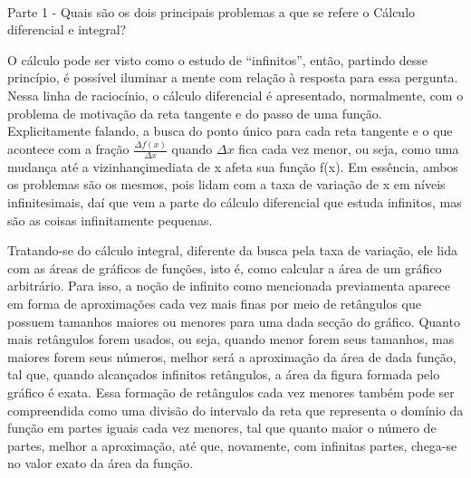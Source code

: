 \documentclass[Calculus1/exercícios_de_cálculo.tex]{subfiles}
\begin{document}
\paragraph{} Parte 1 - Quais são os dois principais problemas a que se refere o Cálculo diferencial e integral?
\begin{sol*}
	O cálculo pode ser visto como o estudo de ``infinitos'', então, partindo desse princípio, é poss\'ivel iluminar a mente com relação à resposta para essa pergunta. Nessa linha de racioc\'inio, o cálculo diferencial é apresentado, normalmente, com o problema de motivaç\~ao da reta tangente e do passo de uma funç\~ao. Explicitamente falando, a busca do ponto único para cada reta tangente e o que acontece com a fraç\~ao $\frac{\Delta{f(x)}}{\Delta{x}}$ quando $\Delta{x}$ fica cada vez menor, ou seja, como uma mudança até a vizinhanç\a imediata de x afeta sua funç\~ao f(x). Em essência, ambos os problemas s\~ao os mesmos, pois lidam com a taxa de variaç\~ao de x em n\'iveis infinitesimais, da\'i que vem a parte do cálculo diferencial que estuda infinitos, mas s\~ao as coisas infinitamente pequenas.

	Tratando-se do cálculo integral, diferente da busca pela taxa de variação, ele lida com as áreas de gráficos de funções, isto é, como calcular a área de um gráfico arbitrário. Para isso, a noção de infinito como mencionada previamenta aparece em forma de aproximações cada vez mais finas por meio de retângulos que possuem tamanhos maiores ou menores para uma dada secç\~ao do gráfico. Quanto mais retângulos forem usados, ou seja, quando menor forem seus tamanhos, mas maiores forem seus números, melhor será a aproximaç\~ao da área de dada funç\~ao, tal que, quando alcançados infinitos retângulos, a área da figura formada pelo gráfico é exata. Essa formaç\~ao de retângulos cada vez menores também pode ser compreendida como uma divis\~ao do intervalo da reta que representa o domínio da funç\~ao em partes iguais cada vez menores, tal que quanto maior o n\'umero de partes, melhor a aproximaç\~ao, até que, novamente, com infinitas partes, chega-se no valor exato da área da funç\~ao.
	\qedsymbol
\end{sol*}
\end{document}
